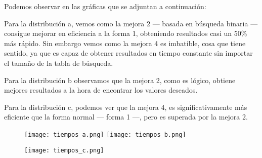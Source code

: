Podemos observar en las gráficas que se adjuntan a continuación:

Para la distribución a, vemos como la mejora 2 --- basada en búsqueda binaria --- consigue mejorar en eficiencia a la forma 1, obteniendo resultados casi un 50\% más rápido. Sin embargo vemos como la mejora 4 es imbatible, cosa que tiene sentido, ya que es capaz de obtener resultados en tiempo constante sin importar el tamaño de la tabla de búsqueda.

Para la distribución b observamos que la mejora 2, como es lógico, obtiene mejores resultados a la hora de encontrar los valores deseados.

Para la distribución c, podemos ver que la mejora 4, es significativamente más eficiente que la forma normal --- forma 1 ---, pero es superada por la mejora 2.

\begin{figure}[H]
	\centering
	\texttt{[image: tiempos\_a.png]}
	\texttt{[image: tiempos\_b.png]}
\end{figure}
\begin{figure}[H]
	\centering
	\texttt{[image: tiempos\_c.png]}
\end{figure}


\newpage
